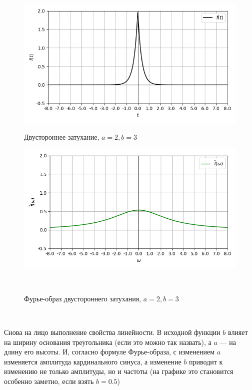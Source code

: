 \documentclass[a4paper]{article}
\begin{document}
\begin{figure}[H]
        \begin{minipage}{0.5\textwidth}
        \centering \includegraphics[width=\textwidth]{fade/real_graph_2_3.png}
        \caption{Двустороннее затухание, $a = 2, b = 3$}
    \end{minipage}\hfill
    \begin{minipage}{0.5\textwidth}
        \centering \includegraphics[width=\textwidth]{fade/real_fourier_2_3.png}
        \caption{Фурье-образ двустороннего затухания, $a = 2, b = 3$}
    \end{minipage}\\[1em]
\end{figure}\noindent\

Снова на лицо выполнение свойства линейности. В исходной функции $b$ влияет на ширину основания треугольника (если это можно так назвать), а $a$ --- на длину его высоты. И, согласно формуле Фурье-образа, с изменением $a$ изменяется амплитуда кардинального синуса, а изменение $b$ приводит к изменению не только амплитуды, но и частоты (на графике это становится особенно заметно, если взять $b=0.5$)\
\end{document}
